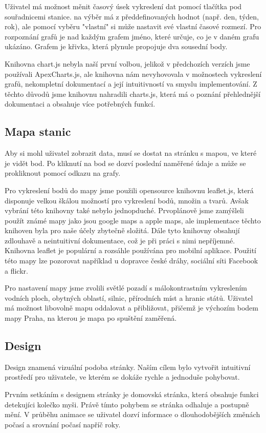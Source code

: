 Uživatel má možnost měnit časový úsek vykreslení dat pomocí tlačítka pod souřadnicemi stanice. na výběr má z předdefinovaných hodnot (např. den, týden, rok), ale pomocí vyběru "vlastní" si může nastavit své vlastní časové rozmezí.
Pro rozpoznání grafů je nad každým grafem jméno, které určuje, co je v daném grafu ukázáno. Grafem je křivka, která plynule propojuje dva sousední body.  

Knihovna chart.js nebyla naší první volbou, jelikož v předchozích verzích jsme používali ApexCharts.js, ale knihovna nám nevyhovovala v možnostech vykreslení grafů, nekompletní dokumentací a její intuitivností va smyslu implementování.
Z těchto důvodů jsme knihovnu nahradili charts.js, která má o poznání přehlednější dokumentaci a obsahuje více potřebných funkcí.

\subsection{Mapa stanic}
Aby si mohl uživatel zobrazit data, musí se dostat na stránku s mapou, ve které je vidět bod. Po kliknutí na bod se dozví poslední naměřené údaje a může se prokliknout pomocí odkazu na grafy.

Pro vykreslení bodů do mapy jsme použili opensource knihovnu leaflet.js, která disponuje velkou škálou možností pro vykreslení bodů, množin a tvarů.
Avšak vybrání této knihovny také nebylo jednopduché. Prvoplánově jsme zamýšleli použít známé mapy jako jsou google maps a apple maps, ale implementace těchto knihoven byla pro naše účely zbytečně složitá. Dále tyto knihovny obsahují zdlouhavě a neintuitivní dokumentace, což je při práci s nimi nepříjemné.
Knihovna leaflet je populární a rozsáhle používána pro mobilní aplikace. Použití této mapy lze pozorovat například u dopravce české dráhy, sociální síti Facebook a flickr.

Pro nastavení mapy jsme zvolili světlé pozadí s málokontrastním vykreslením vodních ploch, obytných oblastí, silnic, přírodních míst a hranic států. Uživatel má možnost libovolně mapu oddalovat a přibližovat, přičemž je výchozím bodem mapy Praha, na kterou je mapa po spuštění zaměřená.

\subsection{Design}
Design znamená vizuální podoba stránky.
Naším cílem bylo vytvořit intuitivní prostředí pro uživatele, ve kterém se dokáže rychle a jednoduše pohybovat.

Prvním setkáním s designem stránky je domovská stránka, která obsahuje funkci detekujíci kolečko myši.
Právě tímto pohybem se stránka odhaluje a postupně mění. V průběhu animace se uživatel dozví informace o dlouhodobějších změnách počasí a srovnání počasí napříč roky.

